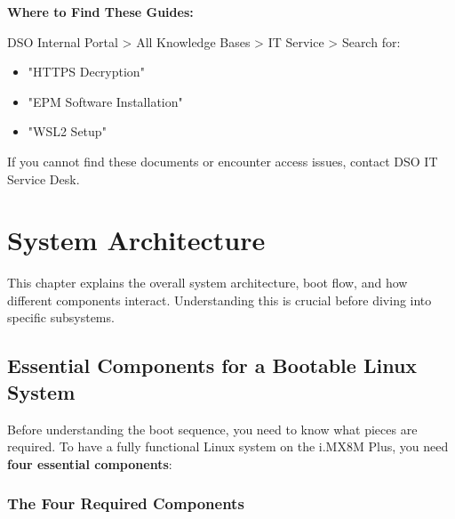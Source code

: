 \documentclass[12pt,a4paper]{report}
\begin{document}
\begin{docref}
\textbf{Where to Find These Guides:}

DSO Internal Portal > All Knowledge Bases > IT Service > Search for:
\begin{itemize}
    \item "HTTPS Decryption"
    \item "EPM Software Installation"
    \item "WSL2 Setup"
\end{itemize}

If you cannot find these documents or encounter access issues, contact DSO IT Service Desk.
\end{docref}




\chapter{System Architecture}

This chapter explains the overall system architecture, boot flow, and how different components interact. Understanding this is crucial before diving into specific subsystems.

\section{Essential Components for a Bootable Linux System}

Before understanding the boot sequence, you need to know what pieces are required. To have a fully functional Linux system on the i.MX8M Plus, you need \textbf{four essential components}:

\subsection{The Four Required Components}
\end{document}
